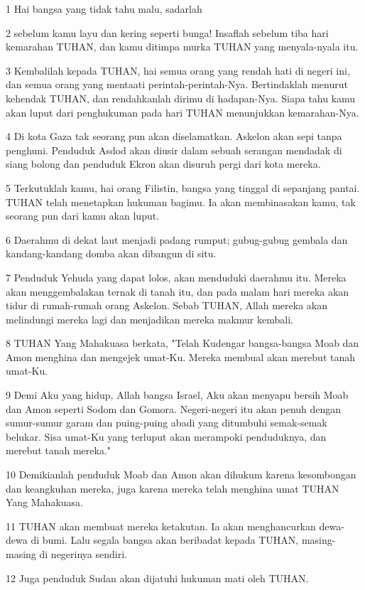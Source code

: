 \par 1 Hai bangsa yang tidak tahu malu, sadarlah
\par 2 sebelum kamu layu dan kering seperti bunga! Insaflah sebelum tiba hari kemarahan TUHAN, dan kamu ditimpa murka TUHAN yang menyala-nyala itu.
\par 3 Kembalilah kepada TUHAN, hai semua orang yang rendah hati di negeri ini, dan semua orang yang mentaati perintah-perintah-Nya. Bertindaklah menurut kehendak TUHAN, dan rendahkanlah dirimu di hadapan-Nya. Siapa tahu kamu akan luput dari penghukuman pada hari TUHAN menunjukkan kemarahan-Nya.
\par 4 Di kota Gaza tak seorang pun akan diselamatkan. Askelon akan sepi tanpa penghuni. Penduduk Asdod akan diusir dalam sebuah serangan mendadak di siang bolong dan penduduk Ekron akan disuruh pergi dari kota mereka.
\par 5 Terkutuklah kamu, hai orang Filistin, bangsa yang tinggal di sepanjang pantai. TUHAN telah menetapkan hukuman bagimu. Ia akan membinasakan kamu, tak seorang pun dari kamu akan luput.
\par 6 Daerahmu di dekat laut menjadi padang rumput; gubug-gubug gembala dan kandang-kandang domba akan dibangun di situ.
\par 7 Penduduk Yehuda yang dapat lolos, akan menduduki daerahmu itu. Mereka akan menggembalakan ternak di tanah itu, dan pada malam hari mereka akan tidur di rumah-rumah orang Askelon. Sebab TUHAN, Allah mereka akan melindungi mereka lagi dan menjadikan mereka makmur kembali.
\par 8 TUHAN Yang Mahakuasa berkata, "Telah Kudengar bangsa-bangsa Moab dan Amon menghina dan mengejek umat-Ku. Mereka membual akan merebut tanah umat-Ku.
\par 9 Demi Aku yang hidup, Allah bangsa Israel, Aku akan menyapu bersih Moab dan Amon seperti Sodom dan Gomora. Negeri-negeri itu akan penuh dengan sumur-sumur garam dan puing-puing abadi yang ditumbuhi semak-semak belukar. Sisa umat-Ku yang terluput akan merampoki penduduknya, dan merebut tanah mereka."
\par 10 Demikianlah penduduk Moab dan Amon akan dihukum karena kesombongan dan keangkuhan mereka, juga karena mereka telah menghina umat TUHAN Yang Mahakuasa.
\par 11 TUHAN akan membuat mereka ketakutan. Ia akan menghancurkan dewa-dewa di bumi. Lalu segala bangsa akan beribadat kepada TUHAN, masing-masing di negerinya sendiri.
\par 12 Juga penduduk Sudan akan dijatuhi hukuman mati oleh TUHAN.
